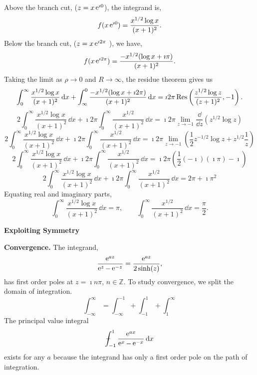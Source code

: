 {\begin{Solution}
  Above the branch cut, ($z = x \mathop{\mathrm{e}}\nolimits^{\imath 0}$), the integrand is,
  \[
  f(x \mathop{\mathrm{e}}\nolimits^{\imath 0 }) = \frac{ x^{1/2} \log x }{ (x+1)^2 }.
  \]
  Below the branch cut, ($z = x \mathop{\mathrm{e}}\nolimits^{\imath 2 \pi}$ ), we have,
  \[
  f(x \mathop{\mathrm{e}}\nolimits^{\imath 2 \pi }) = \frac{ - x^{1/2} ( \log x + \imath \pi ) }{ (x+1)^2 }.
  \]
  Taking the limit as $\rho \to 0$ and $R \to \infty$, the residue theorem
  gives us
  \[
  \int_0^\infty \frac{ x^{1/2} \log x }{ (x+1)^2 } \,\mathrm{d} x
  + \int_\infty^0 \frac{ - x^{1/2} ( \log x + \imath 2 \pi ) }{ (x+1)^2 } \,\mathrm{d} x
  = \imath 2 \pi \mathop{\mathrm{Res}}\nolimits \left( \frac{ z^{1/2} \log z }{ (z+1)^2 }, -1 \right).
  \]
  \[
  2 \int_0^\infty \frac{ x^{1/2} \log x }{ (x+1)^2 } \,\dd x
  + \imath 2 \pi \int_0^\infty \frac{ x^{1/2} }{ (x+1)^2 } \,\dd x
  = \imath 2 \pi \lim_{z \to -1} \frac{\dd}{\dd z} ( z^{1/2} \log z )
  \]
  \[
  2 \int_0^\infty \frac{ x^{1/2} \log x }{ (x+1)^2 } \,\dd x
  + \imath 2 \pi \int_0^\infty \frac{ x^{1/2} }{ (x+1)^2 } \,\dd x
  = \imath 2 \pi \lim_{z \to -1} \left( \frac{1}{2} z^{-1/2} \log z 
    + z^{1/2} \frac{1}{z} \right)
  \]
  \[
  2 \int_0^\infty \frac{ x^{1/2} \log x }{ (x+1)^2 } \,\dd x
  + \imath 2 \pi \int_0^\infty \frac{ x^{1/2} }{ (x+1)^2 } \,\dd x
  = \imath 2 \pi \left( \frac{1}{2} (-\imath) (\imath \pi)  - \imath \right)
  \]
  \[
  2 \int_0^\infty \frac{ x^{1/2} \log x }{ (x+1)^2 } \,\dd x
  + \imath 2 \pi \int_0^\infty \frac{ x^{1/2} }{ (x+1)^2 } \,\dd x
  = 2 \pi + \imath \pi^2
  \]
  Equating real and imaginary parts,
  \[
  \boxed{
    \int_0^\infty \frac{ x^{1/2} \log x }{ (x+1)^2 }\,\dd x = \pi, \qquad
    \int_0^\infty \frac{ x^{1/2} }{ (x+1)^2 }\,\dd x = \frac{\pi}{2}.
    }
  \]
\end{Solution}











\begin{large}
  \noindent
  \textbf{Exploiting Symmetry}
\end{large}










\begin{Solution}
  \label{solution e ax / (e x - e -x)}
  \textbf{Convergence.}
  The integrand, 
  \[
  \frac{ \mathop{\mathrm{e}}\nolimits^{a z} }{ \mathop{\mathrm{e}}\nolimits^z - \mathop{\mathrm{e}}\nolimits^{-z} } = \frac{ \mathop{\mathrm{e}}\nolimits^{a z} }{ 2 \sinh( z ) },
  \]
  has first order poles at $z = \imath n \pi$, $n \in \mathbb{Z}$.  To study 
  convergence, we split the domain of integration.
  \[
  \int_{-\infty}^\infty = \int_{-\infty}^{-1} + \int_{-1}^1 + \int_1^\infty
  \]
  The principal value integral
  \[
  - \negthickspace \negthickspace \negthickspace \negmedspace\int_{-1}^1 \frac{ \mathop{\mathrm{e}}\nolimits^{a x} }{ \mathop{\mathrm{e}}\nolimits^x - \mathop{\mathrm{e}}\nolimits^{-x} } \,\mathrm{d} x
  \]
  exists for any $a$ because the integrand has only a first order pole 
  on the path of integration.


\end{Solution}}
